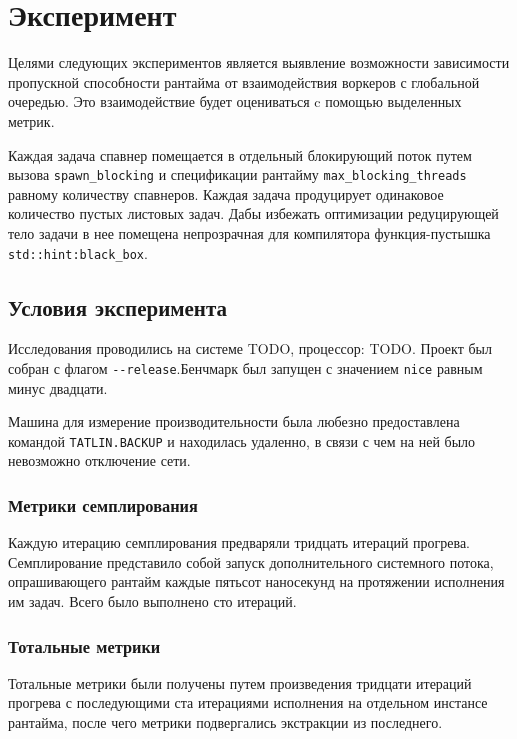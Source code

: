 
\section{Эксперимент}

Целями следующих экспериментов является выявление возможности зависимости пропускной способности рантайма от взаимодействия воркеров с глобальной очередью. Это взаимодействие будет оцениваться c помощью выделенных метрик.

Каждая задача спавнер помещается в отдельный блокирующий поток путем вызова \verb|spawn_blocking| и спецификации рантайму \verb|max_blocking_threads| равному количеству спавнеров. Каждая задача продуцирует одинаковое количество пустых листовых задач. Дабы избежать оптимизации редуцирующей тело задачи в нее помещена непрозрачная для компилятора функция-пустышка \verb|std::hint:black_box|.

\subsection{Условия эксперимента}

Исследования проводились на системе TODO, процессор: TODO. Проект был собран с флагом \verb|--release|.Бенчмарк был запущен с значением \verb|nice| равным минус двадцати.

Машина для измерение производительности была любезно предоставлена командой \verb|TATLIN.BACKUP| и находилась удаленно, в связи с чем на ней было невозможно отключение сети.

\subsubsection{Метрики семплирования}

Каждую итерацию семплирования предваряли тридцать итераций прогрева. Семплирование представило собой запуск дополнительного системного потока, опрашивающего рантайм каждые пятьсот наносекунд на протяжении исполнения им задач. Всего было выполнено сто итераций.

\subsubsection{Тотальные метрики}

Тотальные метрики были получены путем произведения тридцати итераций прогрева с последующими ста итерациями исполнения на отдельном инстансе рантайма, после чего метрики подвергались экстракции из последнего.

